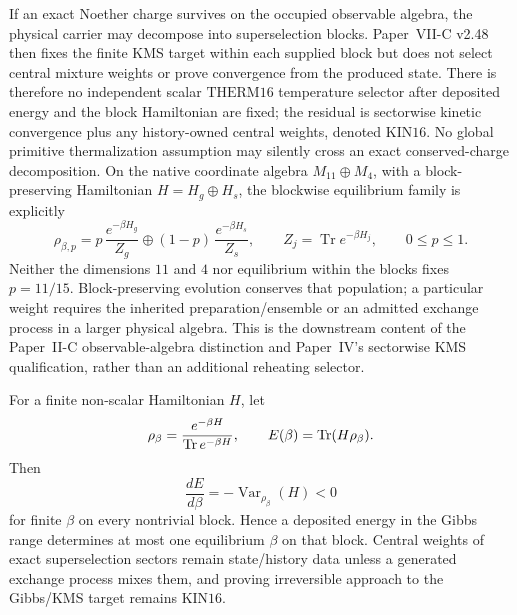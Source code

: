 \documentclass[12pt,a4paper]{article}
\begin{document}
\begin{remark}
\label{p9:rem:v148-k16-sector-aware-thermalization}
If an exact Noether charge survives on the occupied observable algebra, the
physical carrier may decompose into superselection blocks.  Paper~VII-C v2.48
then fixes the finite KMS target within each supplied block but does not select
central mixture weights or prove convergence from the produced state.  There
is therefore no independent scalar \(\mathrm{THERM16}\) temperature selector
after deposited energy and the block Hamiltonian are fixed; the residual is
sectorwise kinetic convergence plus any history-owned central weights, denoted
\(\mathrm{KIN16}\).  No global primitive thermalization assumption may
silently cross an exact conserved-charge decomposition.
On the native coordinate algebra $M_{11}\oplus M_4$, with a block-preserving
Hamiltonian $H=H_g\oplus H_s$, the blockwise equilibrium family is explicitly
\[
 \rho_{\beta,p}=p\,\frac{e^{-\beta H_g}}{Z_g}
       \oplus(1-p)\,\frac{e^{-\beta H_s}}{Z_s},
 \qquad Z_j=\operatorname{Tr}e^{-\beta H_j},\qquad 0\le p\le1.
\]
Neither the dimensions $11$ and $4$ nor equilibrium within the blocks fixes
$p=11/15$. Block-preserving evolution conserves that population; a particular
weight requires the inherited preparation/ensemble or an admitted exchange
process in a larger physical algebra. This is the downstream content of the
Paper~II-C observable-algebra distinction and Paper~IV's sectorwise KMS
qualification, rather than an additional reheating selector.
\end{remark}

\begin{lemma}
\label{p9:lem:v180-gibbs-energy-injectivity}
For a finite non-scalar Hamiltonian $H$, let
\[
 \rho_\beta=\frac{e^{-\beta H}}{\operatorname{Tr} e^{-\beta H}},
 \qquad
 E(\beta)=\operatorname{Tr}(H\rho_\beta).
\]
Then
\[
 \boxed{\frac{dE}{d\beta}
 =-\operatorname{Var}_{\rho_\beta}(H)<0}
\]
for finite $\beta$ on every nontrivial block.  Hence a deposited energy in the
Gibbs range determines at most one equilibrium $\beta$ on that block.
Central weights of exact superselection sectors remain state/history data
unless a generated exchange process mixes them, and proving irreversible
approach to the Gibbs/KMS target remains \(\mathrm{KIN16}\).
\end{lemma}
\end{document}
